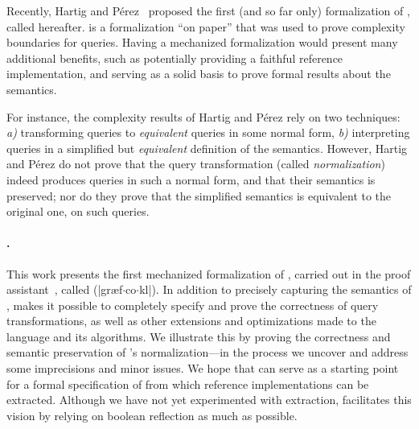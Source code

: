 Recently, Hartig and Pérez~\cite{gqlph} proposed the first (and so far only) formalization of \gql, called \HP hereafter. 
\HP is a formalization ``on paper'' that was used to prove complexity boundaries for \gql queries. Having a mechanized formalization would present many additional benefits, such as potentially providing a faithful reference implementation, and serving as a solid basis to prove formal results about the \gql semantics. 

For instance, the complexity results of Hartig and Pérez rely on two techniques: {\em a)} transforming queries to {\em equivalent} queries in some  normal form, {\em b)} interpreting queries in a simplified but {\em equivalent} definition of the semantics. However, Hartig and Pérez do not prove that the query transformation (called {\em normalization}) indeed produces queries in such a normal form, and that their semantics is preserved; nor do they prove that the simplified semantics is equivalent to the original one, on such queries.



\paragraph{\gcoql.} This work presents the first mechanized formalization of \gql, carried out in the \coq proof assistant~\cite{Coq}, called \gcoql (|græf$\cdot$co$\cdot$k{\pmschwa}l|). In addition to precisely capturing the semantics of \gql, \gcoql makes it possible to completely specify and prove the correctness of query transformations, as well as other extensions and optimizations made to the language and its algorithms. We illustrate this by proving the correctness and semantic preservation of \HP's normalization---in the process we uncover and address some imprecisions and minor issues.
We hope that \gcoql can serve as a starting point for a formal specification of \gql from which reference implementations can be extracted. Although we have not yet experimented with extraction, \gcoql facilitates this vision by relying on boolean reflection as much as possible.


